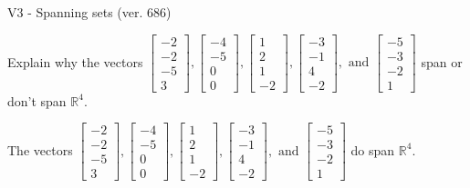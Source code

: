 \begin{exercise}
  \begin{exerciseTitle}V3 - Spanning sets (ver. 686)\end{exerciseTitle}
  \begin{exerciseStatement}
    Explain why the vectors \(\left[\begin{array}{r}
-2 \\
-2 \\
-5 \\
3
\end{array}\right] , \left[\begin{array}{r}
-4 \\
-5 \\
0 \\
0
\end{array}\right] , \left[\begin{array}{r}
1 \\
2 \\
1 \\
-2
\end{array}\right] , \left[\begin{array}{r}
-3 \\
-1 \\
4 \\
-2
\end{array}\right] , \text{ and } \left[\begin{array}{r}
-5 \\
-3 \\
-2 \\
1
\end{array}\right]\) span or don't span \(\mathbb{R}^4\). 
	


  \end{exerciseStatement}
  \begin{exerciseAnswer}
   The vectors \(\left[\begin{array}{r}
-2 \\
-2 \\
-5 \\
3
\end{array}\right] , \left[\begin{array}{r}
-4 \\
-5 \\
0 \\
0
\end{array}\right] , \left[\begin{array}{r}
1 \\
2 \\
1 \\
-2
\end{array}\right] , \left[\begin{array}{r}
-3 \\
-1 \\
4 \\
-2
\end{array}\right] , \text{ and } \left[\begin{array}{r}
-5 \\
-3 \\
-2 \\
1
\end{array}\right]\) 
  	 do  
	span \(\mathbb{R}^4\).
  



\end{exerciseAnswer}
\end{exercise}

